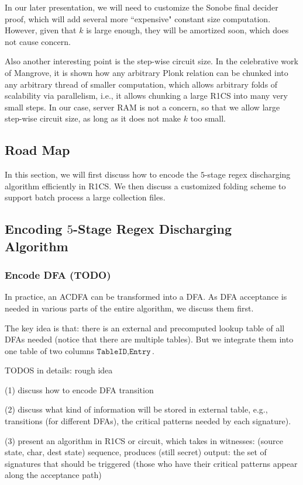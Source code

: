 In our later presentation, we will need to customize the Sonobe final decider
proof, which will add several more ``expensive" constant size computation. 
However, given that $k$ is large enough, they will be amortized soon, which
does not cause concern. 

Also another interesting point is the step-wise circuit size.
In the celebrative work of Mangrove, it is shown how any arbitrary Plonk
relation can be chunked into any arbitrary thread of smaller computation,
which allows arbitrary folds of scalability via parallelism, i.e.,
it allows chunking a large R1CS into many very small steps.
In our case, server RAM is not a concern, so that we allow large
step-wise circuit size, as long as it does not make $k$ too small.

\subsection{Road Map}
In this section, we will first discuss how to encode the $5$-stage 
regex discharging algorithm efficiently in R1CS. We then discuss a 
customized folding scheme to support batch process a large collection
files. 

\subsection{Encoding $5$-Stage Regex Discharging Algorithm}
\subsubsection{Encode DFA (TODO)}
In practice, an ACDFA can be transformed into a DFA. As DFA acceptance is
needed in various parts of the entire algorithm, we discuss them first.

The key idea is that: there is an external and precomputed lookup table
of all DFAs needed (notice that there are multiple tables). But we integrate
them into one table of two columns $\texttt{TableID}, \texttt{Entry}$.

TODOS in details: rough idea

(1) discuss how to encode DFA transition

(2) discuss what kind of information will be stored in external table, e.g., transitions (for different DFAs), the critical patterns needed by each signature).

(3) present an algorithm in R1CS or circuit, which takes in witnesses: (source state, char, dest state) sequence, produces (still secret) output: the set of signatures that should be triggered (those who have their critical patterns appear along the acceptance path)

